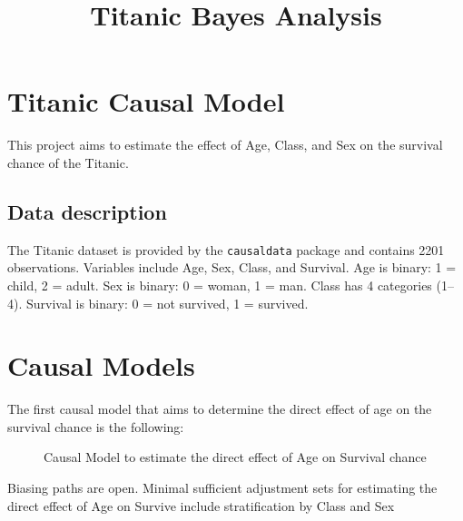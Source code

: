 \documentclass[12pt]{article}
\title{Titanic Bayes Analysis}
\begin{document}
	
	\maketitle
	
	\section{Titanic Causal Model}
	This project aims to estimate the effect of Age, Class, and Sex on the survival chance of the Titanic. 
	
	\subsection{Data description}
	The Titanic dataset is provided by the \texttt{causaldata} package and contains 2201 observations. 
	Variables include Age, Sex, Class, and Survival. 
	Age is binary: 1 = child, 2 = adult. 
	Sex is binary: 0 = woman, 1 = man. 
	Class has 4 categories (1–4). 
	Survival is binary: 0 = not survived, 1 = survived. 
	
	\section{Causal Models}
	The first causal model that aims to determine the direct effect of age on the survival chance is the following:
	
\begin{figure}[H]
	\centering
	\caption{Causal Model to estimate the direct effect of Age on Survival chance}
	\label{fig:titanic_dag}
\end{figure}


Biasing paths are open.
Minimal sufficient adjustment sets for estimating the direct effect of Age on Survive include stratification by Class and Sex\\
\end{document}
